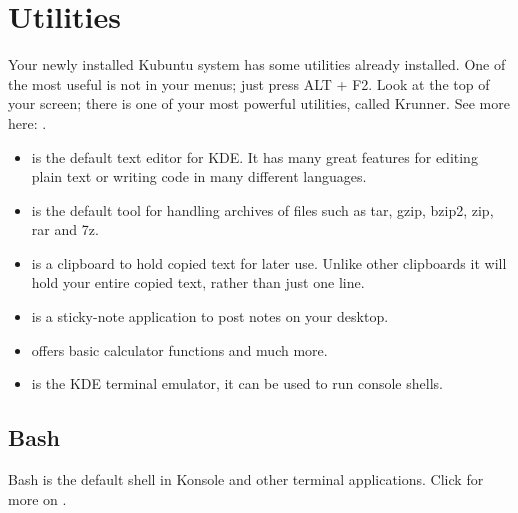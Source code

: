 \documentclass[letterpaper,10pt,english]{sphinxmanual}
\begin{document}
\section{Utilities}
\label{\detokenize{docs/software:utilities}}
Your newly installed Kubuntu system has some utilities already installed. One of the most useful is not in your menus; just press ALT + F2. Look at the top of your screen; there is one of your most powerful utilities, called Krunner. See more here: .
\begin{itemize}
\item {} 
 is the default text editor for KDE. It has many great features for editing plain text or writing code in many different languages.

\item {} 
 is the default tool for handling archives of files such as tar, gzip, bzip2, zip, rar and 7z.

\item {} 
 is a clipboard to hold copied text for later use. Unlike other clipboards it will hold your entire copied text, rather than just one line.

\item {} 
 is a sticky-note application to post notes on your desktop.

\item {} 
 offers basic calculator functions and much more.

\item {} 
 is the KDE terminal emulator, it can be used to run console shells.

\end{itemize}


\subsection{Bash}
\label{\detokenize{docs/software:bash}}
Bash is the default shell in Konsole and other terminal applications. Click for more on .
\end{document}
